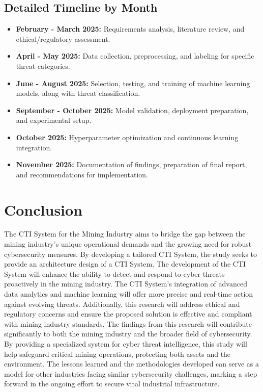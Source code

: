 \documentclass[a4paper,twoside,12pt]{report}
\begin{document}
\section{Detailed Timeline by Month}

\begin{itemize}
    \item \textbf{February - March 2025:} Requirements analysis, literature review, and ethical/regulatory assessment.
    \item \textbf{April - May 2025:} Data collection, preprocessing, and labeling for specific threat categories.
    \item \textbf{June - August 2025:} Selection, testing, and training of machine learning models, along with threat classification.
    \item \textbf{September - October 2025:} Model validation, deployment preparation, and experimental setup.
    \item \textbf{October 2025:} Hyperparameter optimization and continuous learning integration.
    \item \textbf{November 2025:} Documentation of findings, preparation of final report, and recommendations for implementation.
\end{itemize}



\chapter{Conclusion}

The CTI System for the Mining Industry aims to bridge the gap between the mining industry's unique operational demands and the growing need for robust cybersecurity measures. By developing a tailored CTI System, the study seeks to provide an architecture design of a CTI System. The development of the CTI System will enhance the ability to detect and respond to cyber threats proactively in the mining industry. The CTI System's integration of advanced data analytics and machine learning will offer more precise and real-time action against evolving threats. Additionally, this research will address ethical and regulatory concerns and ensure the proposed solution is effective and compliant with mining industry standards.
The findings from this research will contribute significantly to both the mining industry and the broader field of cybersecurity. By providing a specialized system for cyber threat intelligence, this study will help safeguard critical mining operations, protecting both assets and the environment. The lessons learned and the methodologies developed can serve as a model for other industries facing similar cybersecurity challenges, marking a step forward in the ongoing effort to secure vital industrial infrastructure.
\end{document}
